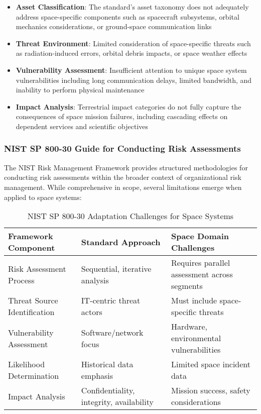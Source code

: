 \documentclass[binding=0.6cm]{sapthesis}
\begin{document}
\begin{itemize}
    \item \textbf{Asset Classification}: The standard's asset taxonomy does not adequately address space-specific components such as spacecraft subsystems, orbital mechanics considerations, or ground-space communication links
    \item \textbf{Threat Environment}: Limited consideration of space-specific threats such as radiation-induced errors, orbital debris impacts, or space weather effects
    \item \textbf{Vulnerability Assessment}: Insufficient attention to unique space system vulnerabilities including long communication delays, limited bandwidth, and inability to perform physical maintenance
    \item \textbf{Impact Analysis}: Terrestrial impact categories do not fully capture the consequences of space mission failures, including cascading effects on dependent services and scientific objectives
\end{itemize}

\subsubsection{NIST SP 800-30 Guide for Conducting Risk Assessments}

The NIST Risk Management Framework provides structured methodologies for conducting risk assessments within the broader context of organizational risk management. While comprehensive in scope, several limitations emerge when applied to space systems:

\begin{table}[H]
\centering
\caption{NIST SP 800-30 Adaptation Challenges for Space Systems}
\begin{tabular}{|p{3.5cm}|p{4cm}|p{6cm}|}
\hline
\textbf{Framework Component} & \textbf{Standard Approach} & \textbf{Space Domain Challenges} \\ \hline
Risk Assessment Process & Sequential, iterative  analysis & Requires parallel assessment across segments \\ \hline
Threat Source Identification & IT-centric threat actors & Must include space-specific threats \\ \hline
Vulnerability Assessment & Software/network focus & Hardware, environmental vulnerabilities \\ \hline
Likelihood Determination & Historical data emphasis & Limited space incident data \\ \hline
Impact Analysis & Confidentiality, integrity, availability & Mission success, safety considerations \\ \hline
\end{tabular}
\end{table}
\end{document}
